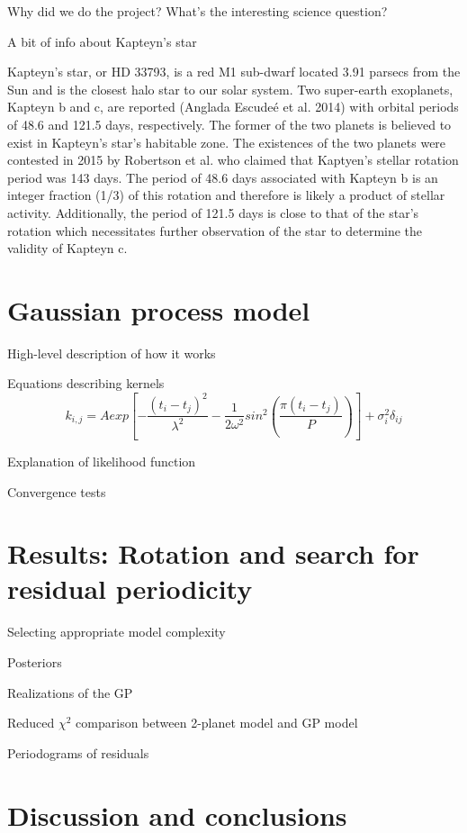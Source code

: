 \documentclass{aastex6}
\begin{document}
Why did we do the project? What's the interesting science
question?

A bit of info about Kapteyn's star

Kapteyn's star, or HD 33793, is a red M1 sub-dwarf located 3.91 parsecs from the Sun and is the closest halo star to our solar system.
Two super-earth exoplanets, Kapteyn b and c, are reported (Anglada Escude\'e et al. 2014) with orbital periods of 48.6 and 121.5 days, respectively.
The former of the two planets is believed to exist in Kapteyn's star's habitable zone.
The existences of the two planets were contested in 2015 by Robertson et al. who claimed that Kaptyen's stellar rotation period was 143 days. The period of 48.6 days associated with Kapteyn b is an integer fraction (1/3) of this rotation and therefore is likely a product of stellar activity.
Additionally, the period of 121.5 days is close to that of the star's rotation which necessitates further observation of the star to determine the validity of Kapteyn c.

\section{Gaussian process model}

High-level description of how it works

Equations describing kernels
\begin{equation}
  k_{i,j} = Aexp[-\frac{(t_i - t_j)^2}{\lambda^2} - \frac{1}{2\omega^2}sin^2(\frac{\pi(t_i -t_j)}{P})] + \sigma_i^2\delta_{ij}
  \end{equation}

Explanation of likelihood function

Convergence tests

\section{Results: Rotation and search for residual periodicity}

Selecting appropriate model complexity

Posteriors

Realizations of the GP

Reduced $\chi^2$ comparison between 2-planet model and GP model

Periodograms of residuals

\section{Discussion and conclusions}
\end{document}
